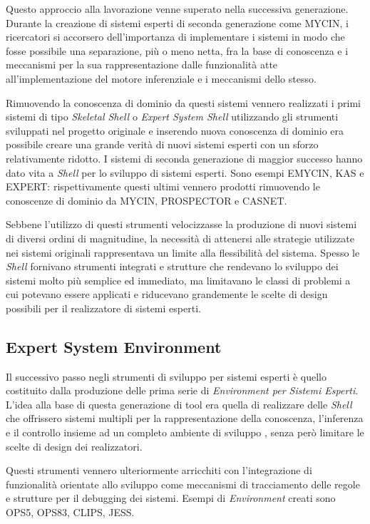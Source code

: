 Questo approccio alla lavorazione venne superato nella successiva generazione. Durante la creazione di sistemi esperti di seconda generazione come MYCIN, i ricercatori si accorsero dell'importanza di implementare i sistemi in modo che fosse possibile una separazione, più o meno netta, fra la base di conoscenza e i meccanismi per la sua rappresentazione dalle funzionalità atte all'implementazione del motore inferenziale e i meccanismi dello stesso.

Rimuovendo la conoscenza di dominio da questi sistemi vennero realizzati i primi sistemi di tipo \emph{Skeletal Shell} o \emph{Expert System Shell} utilizzando gli strumenti sviluppati nel progetto originale e inserendo nuova conoscenza di dominio era possibile creare una grande verità di nuovi sistemi esperti con un sforzo relativamente ridotto. I sistemi di seconda generazione di maggior successo hanno dato vita a \emph{Shell} per lo sviluppo di sistemi esperti. Sono esempi EMYCIN, KAS e EXPERT: rispettivamente questi ultimi vennero prodotti rimuovendo le conoscenze di dominio da MYCIN, PROSPECTOR e CASNET.

Sebbene l'utilizzo di questi strumenti velocizzasse la produzione di nuovi sistemi di diversi ordini di magnitudine, la necessità di attenersi alle strategie utilizzate nei sistemi originali rappresentava un limite alla flessibilità del sistema. Spesso le \emph{Shell} fornivano strumenti integrati e strutture che rendevano lo sviluppo dei sistemi molto più semplice ed immediato, ma limitavano le classi di problemi a cui potevano essere applicati e riducevano grandemente le scelte di design possibili per il realizzatore di sistemi esperti. \cite{development1993}

\subsection{Expert System Environment}

Il successivo passo negli strumenti di sviluppo per sistemi esperti è quello costituito dalla produzione delle prima serie di \emph{Environment per Sistemi Esperti}. L'idea alla base di questa generazione di tool era quella di realizzare delle \emph{Shell} che offrissero sistemi multipli per la rappresentazione della conoscenza, l'inferenza e il controllo insieme ad un completo ambiente di sviluppo \cite{development1993}, senza però limitare le scelte di design dei realizzatori.

Questi strumenti vennero ulteriormente arricchiti con l'integrazione di funzionalità orientate allo sviluppo come meccanismi di tracciamento delle regole e strutture per il debugging dei sistemi. Esempi di \emph{Environment} creati sono OPS5, OPS83, CLIPS, JESS.

